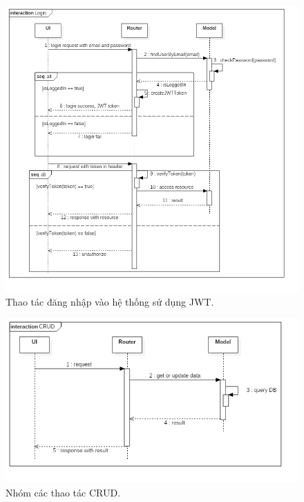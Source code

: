 \documentclass[a4paper,12pt,oneside]{article}
\begin{document}
\begin{figure}[H]
\begin{center}
\includegraphics[scale=.5]{hinh/seq-login.png}
\end{center}
\caption{Thao tác đăng nhập vào hệ thống sử dụng JWT.}
\end{figure}

\begin{figure}[H]
\begin{center}
\includegraphics[scale=.65]{hinh/seq-CRUD.png}
\end{center}
\caption{Nhóm các thao tác CRUD.}
\end{figure}
\end{document}
